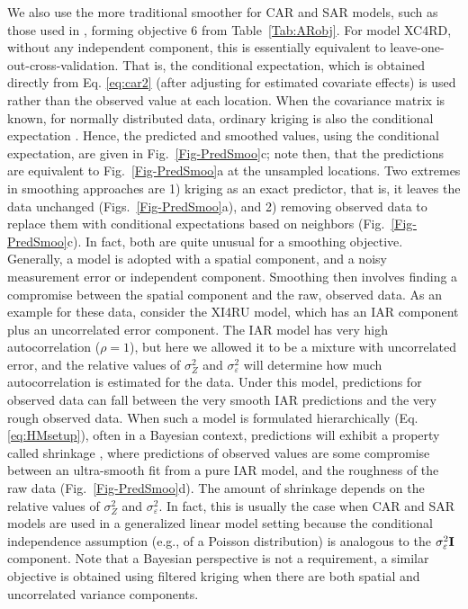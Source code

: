 \documentclass[11pt, titlepage]{article}\usepackage[]{graphicx}\usepackage[]{color}
\begin{document}
\begin{spacing}{1.9}
\begin{flushleft}
We also use the more traditional smoother for CAR and SAR models, such as those used in \citep{Clay:Kald:empi:1987}, forming objective 6 from Table~\ref{Tab:ARobj}.  For model XC4RD, without any independent component, this is essentially equivalent to leave-one-out-cross-validation. That is, the conditional expectation, which is obtained directly from Eq. \ref{eq:car2} (after adjusting for estimated covariate effects) is used rather than the observed value at each location. When the covariance matrix is known, for normally distributed data, ordinary kriging is also the conditional expectation \citep[p. 108, 174]{Cres:stat:1993}.  Hence, the predicted and smoothed values, using the conditional expectation, are given in Fig.~\ref{Fig-PredSmoo}c; note then, that the predictions are equivalent to Fig.~\ref{Fig-PredSmoo}a at the unsampled locations. Two extremes in smoothing approaches are 1) kriging as an exact predictor, that is, it leaves the data unchanged (Figs.~\ref{Fig-PredSmoo}a), and 2) removing observed data to replace them with conditional expectations based on neighbors (Fig.~\ref{Fig-PredSmoo}c).  In fact, both are quite unusual for a smoothing objective. Generally, a model is adopted with a spatial component, and a noisy measurement error or independent component.  Smoothing then involves finding a compromise between the spatial component and the raw, observed data. As an example for these data, consider the XI4RU model, which has an IAR component plus an uncorrelated error component.  The IAR model has very high autocorrelation ($\rho = 1$), but here we allowed it to be a mixture with uncorrelated error, and the relative values of $\sigma_Z^2$ and $\sigma^2_\varepsilon$ will determine how much autocorrelation is estimated for the data.  Under this model, predictions for observed data can fall between the very smooth IAR predictions and the very rough observed data. When such a model is formulated hierarchically (Eq. \ref{eq:HMsetup}), often in a Bayesian context, predictions will exhibit a property called shrinkage \citep{Fay:Herr:esti:1979}, where predictions of observed values are some compromise between an ultra-smooth fit from a pure IAR model, and the roughness of the raw data (Fig.~\ref{Fig-PredSmoo}d).  The amount of shrinkage depends on the relative values of $\sigma_Z^2$ and $\sigma^2_\varepsilon$.  In fact, this is usually the case when CAR and SAR models are used in a generalized linear model setting because the conditional independence assumption (e.g., of a Poisson distribution) is analogous to the $\sigma^2_\varepsilon\mathbf{I}$ component.  Note that a Bayesian perspective is not a requirement, a similar objective is obtained using filtered kriging \citep[][pg. 306]{Wall:Gotw:appl:2004} when there are both spatial and uncorrelated variance components.


\end{flushleft}
\end{spacing}
\end{document}
